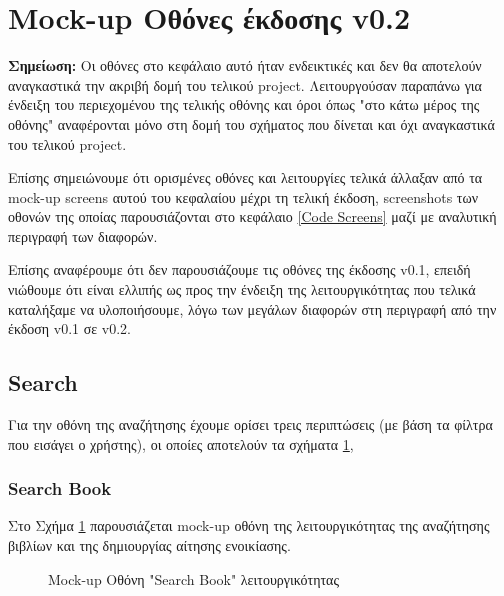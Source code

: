 \documentclass[12pt,a4paper]{article}
\begin{document}
\section{Mock-up Οθόνες έκδοσης v0.2}
\label{Mock-up Screens}

\textbf{Σημείωση:} Οι οθόνες στο κεφάλαιο αυτό ήταν ενδεικτικές και δεν θα αποτελούν αναγκαστικά την ακριβή δομή του τελικού project. Λειτουργούσαν παραπάνω για ένδειξη του περιεχομένου της τελικής οθόνης και όροι όπως "στο κάτω μέρος της οθόνης" αναφέρονται μόνο στη δομή του σχήματος που δίνεται και όχι αναγκαστικά του τελικού project.

Επίσης σημειώνουμε ότι ορισμένες οθόνες και λειτουργίες τελικά άλλαξαν από τα mock-up screens αυτού του κεφαλαίου μέχρι τη τελική έκδοση, screenshots των οθονών της οποίας παρουσιάζονται στο κεφάλαιο \ref{Code Screens} μαζί με αναλυτική περιγραφή των διαφορών.

Επίσης αναφέρουμε ότι δεν παρουσιάζουμε τις οθόνες της έκδοσης v0.1, επειδή νιώθουμε ότι είναι ελλιπής ως προς την ένδειξη της λειτουργικότητας που τελικά καταλήξαμε να υλοποιήσουμε, λόγω των μεγάλων διαφορών στη περιγραφή από την έκδοση v0.1 σε v0.2.

\subsection{Search}

Για την οθόνη της αναζήτησης έχουμε ορίσει τρεις περιπτώσεις (με βάση τα φίλτρα που εισάγει ο χρήστης), οι οποίες αποτελούν τα σχήματα \ref{Mock-up Οθόνη "Search Book" λειτουργικότητας},

\subsubsection{Search Book}

Στο Σχήμα \ref{Mock-up Οθόνη "Search Book" λειτουργικότητας} παρουσιάζεται mock-up οθόνη της λειτουργικότητας της αναζήτησης βιβλίων και της δημιουργίας αίτησης ενοικίασης.

\begin{figure}[H]
	\caption{Mock-up Οθόνη "Search Book" λειτουργικότητας}
	\label{Mock-up Οθόνη "Search Book" λειτουργικότητας}
\end{figure}
\end{document}
